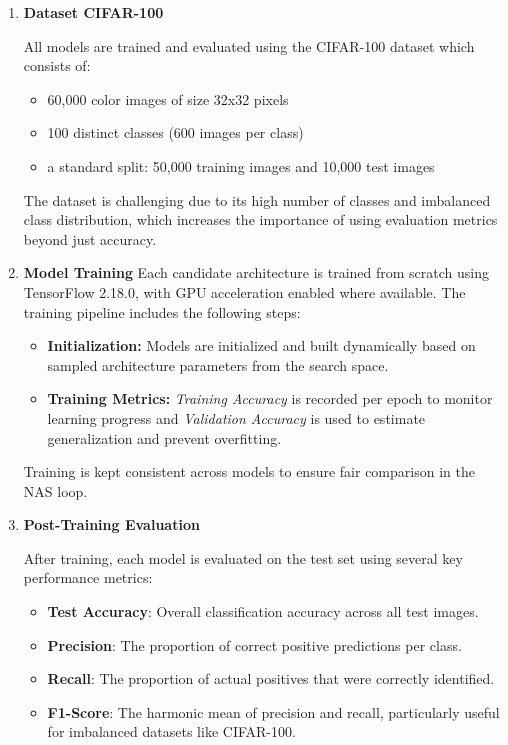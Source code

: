 \begin{enumerate}

    \item \textbf{Dataset CIFAR-100}
    
    All models are trained and evaluated using the CIFAR-100 dataset which consists of:
\begin{itemize}
    \item 60,000 color images of size 32x32 pixels
    \item 100 distinct classes (600 images per class)
\item a standard split: 50,000 training images and 10,000 test images

\end{itemize}
The dataset is challenging due to its high number of classes and imbalanced class distribution, which increases the importance of using evaluation metrics beyond just accuracy.

    \item \textbf{Model Training}
    Each candidate architecture is trained from scratch using TensorFlow 2.18.0, with GPU acceleration enabled where available. The training pipeline includes the following steps:
    
\begin{itemize}
    \item \textbf{Initialization:} Models are initialized and built dynamically based on sampled architecture parameters from the search space.
    \item \textbf{Training Metrics:} \textit{Training Accuracy} is recorded per epoch to monitor learning progress and \textit{Validation Accuracy} is used to estimate generalization and prevent overfitting.

\end{itemize}

Training is kept consistent across models to ensure fair comparison in the NAS loop.
\item \textbf{Post-Training Evaluation}

After training, each model is evaluated on the test set using several key performance metrics: 
\begin{itemize}
    \item \textbf{Test Accuracy}: Overall classification accuracy across all test images.
    \item \textbf{Precision}: The proportion of correct positive predictions per class.
    \item \textbf{Recall}: The proportion of actual positives that were correctly identified.
    \item \textbf{F1-Score}: The harmonic mean of precision and recall, particularly useful for imbalanced datasets like CIFAR-100.



\end{itemize}
\end{enumerate}
